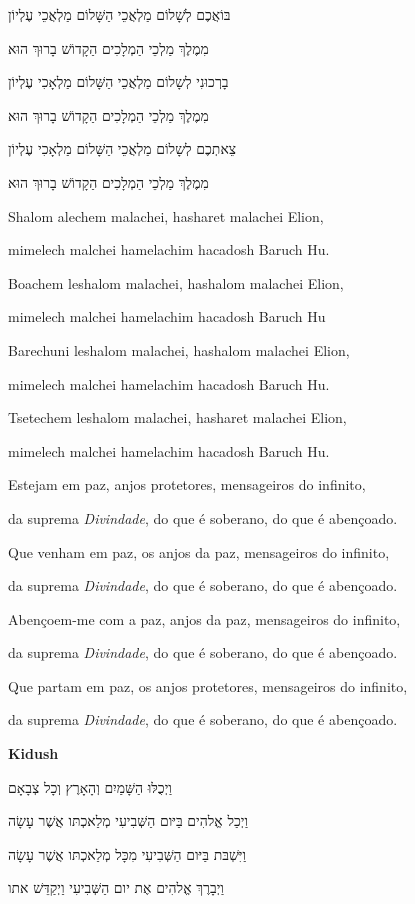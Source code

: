 בּוֹאֲכֶם לְשָׁלוֹם מַלְאֲכֵי הַשָּׁלוֹם מַלְאֲכֵי עֶלְיוֹן

מִמֶלֶךְ מַלְכֵי הַמְלָכִים הַקָדוֹשׁ בָרוּךְ הוּא

בָרְכוּנִי לְשָלוֹם מַלְאֲכֵי הַשָּׁלוֹם מַלְאָכִי עֶלְיוֹן

מִמֶלֶךְ מַלְכֵי הַמְלָכִים הַקָדוֹשׁ בָרוּךְ הוּא

צֵאתְכֶם לְשָלוֹם מַלְאֲכֵי הַשָּׁלוֹם מַלְאָכִי עֶלְיוֹן

מִמֶלֶךְ מַלְכֵי הַמְלָכִים הַקָדוֹשׁ בָרוּךְ הוּא

Shalom alechem malachei, hasharet malachei Elion,

mimelech malchei hamelachim hacadosh Baruch Hu.

Boachem leshalom malachei, hashalom malachei Elion,

mimelech malchei hamelachim hacadosh Baruch Hu

Barechuni leshalom malachei, hashalom malachei Elion,

mimelech malchei hamelachim hacadosh Baruch Hu.

Tsetechem leshalom malachei, hasharet malachei Elion,

mimelech malchei hamelachim hacadosh Baruch Hu.

Estejam em paz, anjos protetores, mensageiros do infinito,

da suprema \emph{Divindade}, do que é soberano, do que é abençoado.

Que venham em paz, os anjos da paz, mensageiros do infinito,

da suprema \emph{Divindade}, do que é soberano, do que é abençoado.

Abençoem-me com a paz, anjos da paz, mensageiros do infinito,

da suprema \emph{Divindade}, do que é soberano, do que é abençoado.

Que partam em paz, os anjos protetores, mensageiros do infinito,

da suprema \emph{Divindade}, do que é soberano, do que é abençoado.

\textbf{Kidush}

וַיְכֻלּוּ הַשָּׁמַיִם וְהָאָרֶץ וְכָל צְבָאָם

וַיְכַל אֱלהִים בַּיּום הַשְּׁבִיעִי מְלַאכְתּו אֲשֶׁר עָשָׂה

וַיִּשְׁבּת בַּיּום הַשְּׁבִיעִי מִכָּל מְלַאכְתּו אֲשֶׁר עָשָׂה

וַיְבָרֶךְ אֱלהִים אֶת יום הַשְּׁבִיעִי וַיְקַדֵּשׁ אתו

